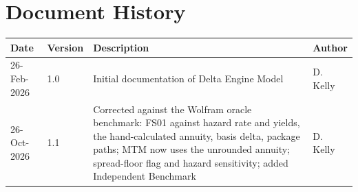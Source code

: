 \documentclass[11pt,a4paper]{article}
\renewcommand{\mkmhistorypage}[1]{%
    \section{Document History}
    \begin{table}[ht]
        \centering
        \begin{tabular}{l|l|p{10cm}|l}
            \textbf{Date} & \textbf{Version} & \textbf{Description} & \textbf{Author} \\
            \hline
            #1
        \end{tabular}
        \label{tab:revision_history}
    \end{table}
    \clearpage
}
\begin{document}
\clearpage

\mkmchangelog

\mkmhistorypage{26-Feb-2026 & 1.0 & Initial documentation of Delta Engine Model & D. Kelly \\
26-Oct-2026 & 1.1 & Corrected against the Wolfram oracle benchmark: FS01 against hazard rate and yields, the hand-calculated annuity, basis delta, package paths; MTM now uses the unrounded annuity; spread-floor flag and hazard sensitivity; added Independent Benchmark & D. Kelly \\}
\end{document}
